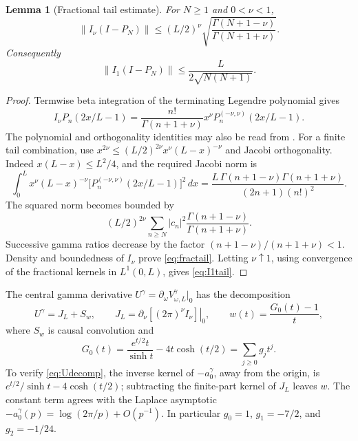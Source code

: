 \documentclass[11pt]{article}
\numberwithin{equation}{section}
\newtheorem{lemma}[theorem]{Lemma}
\theoremstyle{definition}
\theoremstyle{remark}
\newcommand{\norm}[1]{\lVert#1\rVert}
\begin{document}
\begin{lemma}[Fractional tail estimate]\label{lem:fractional}
For $N\ge1$ and $0<\nu<1$,
\begin{equation}\label{eq:fractail}
 \norm{I_\nu(I-P_N)}\le
 (L/2)^\nu\sqrt{\frac{\Gamma(N+1-\nu)}{\Gamma(N+1+\nu)}}.
\end{equation}
Consequently
\begin{equation}\label{eq:I1tail}
 \norm{I_1(I-P_N)}\le\frac{L}{2\sqrt{N(N+1)}}.
\end{equation}
\end{lemma}
\begin{proof}
Termwise beta integration of the terminating Legendre polynomial gives
\[
 I_\nu P_n(2x/L-1)=
 \frac{n!}{\Gamma(n+1+\nu)}x^\nu
 P_n^{(-\nu,\nu)}(2x/L-1).
\]
The polynomial and orthogonality identities may also be read from
\cite[\S\S18.3,18.5,18.17]{DLMF}. For a finite tail combination, use
$x^{2\nu}\le(L/2)^{2\nu}x^\nu(L-x)^{-\nu}$ and Jacobi orthogonality.
Indeed $x(L-x)\le L^2/4$, and the required Jacobi norm is
\[
 \int_0^L x^\nu(L-x)^{-\nu}
 \bigl[P_n^{(-\nu,\nu)}(2x/L-1)\bigr]^2\,dx
 =\frac{L\,\Gamma(n+1-\nu)\Gamma(n+1+\nu)}
 {(2n+1)(n!)^2}.
\]
The squared norm becomes bounded by
\[
 (L/2)^{2\nu}\sum_{n\ge N}|c_n|^2
 \frac{\Gamma(n+1-\nu)}{\Gamma(n+1+\nu)}.
\]
Successive gamma ratios decrease by the factor
$(n+1-\nu)/(n+1+\nu)<1$. Density and boundedness of $I_\nu$ prove
\eqref{eq:fractail}. Letting $\nu\uparrow1$, using convergence of the
fractional kernels in $L^1(0,L)$, gives \eqref{eq:I1tail}.
\end{proof}

The central gamma derivative $U^\gamma=\partial_\omega V^\gamma_{\omega,L}|_0$
has the decomposition
\begin{equation}\label{eq:Udecomp}
 U^\gamma=J_L+S_w,\qquad
 J_L=\left.\partial_\nu[(2\pi)^\nu I_\nu]\right|_0,
 \qquad w(t)=\frac{G_0(t)-1}{t},
\end{equation}
where $S_w$ is causal convolution and
\begin{equation}\label{eq:G0}
 G_0(t)=\frac{e^{t/2}t}{\sinh t}-4t\cosh(t/2)
 =\sum_{j\ge0}g_jt^j.
\end{equation}
To verify \eqref{eq:Udecomp}, the inverse kernel of $-a^\gamma_0$, away
from the origin, is
$e^{t/2}/\sinh t-4\cosh(t/2)$; subtracting the finite-part kernel of
$J_L$ leaves $w$. The constant term agrees with the Laplace asymptotic
$-a^\gamma_0(p)=\log(2\pi/p)+O(p^{-1})$.
In particular $g_0=1$, $g_1=-7/2$, and $g_2=-1/24$.
\end{document}
